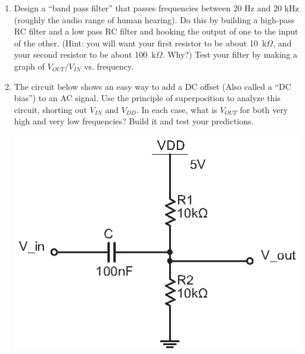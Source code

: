 \begin{enumerate}[wide]
\item Design a ``band pass filter'' that passes frequencies between 20 Hz and 20 kHz (roughly the audio range of human hearing).  Do this by building a high-pass RC filter and a low pass RC filter and hooking the output of one to the input of the other.  (Hint: you will want your first resistor to be about 10~k$\Omega$, and your second resistor to be about 100~k$\Omega$.  Why?)   Test your filter by making a graph of $V_{OUT}/V_{IN}$ vs. frequency.



\item The circuit below shows an easy way to add a DC offset (Also called a ``DC bias'') to an AC signal.  Use the principle of superposition to analyze this circuit, shorting out $V_{IN}$ and $V_{DD}$.  In each case, what is $V_{OUT}$ for both very high and very low frequencies?  Build it and test your predictions.
\begin{center}
\includegraphics{filters/DC_biasing.eps}
\end{center}


\end{enumerate}
